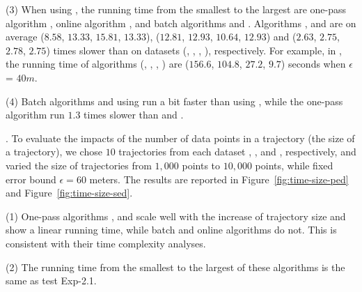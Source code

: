 \sstab (3) When using \sed, the running time from the smallest to the largest are one-pass algorithm \cised, online algorithm \squishe, and batch algorithms \tpa and \dpa. 
Algorithms \tpa, \dpa and \squishe are on average
($8.58$, $13.33$, $15.81$, $13.33$), ($12.81$, $12.93$, $10.64$, $12.93$) and
($2.63$, $2.75$, $2.78$, $2.75$) times slower than \cised on datasets (\ucar, \geolife, \mopsi, \act), respectively.
%
For example, in \mopsi, the running time of algorithms
(\tpa, \dpa, \squishe, \cised) are  ($156.6$, $104.8$, $27.2$, $9.7$) seconds when $\epsilon$ = $40m$.

\sstab (4) Batch algorithms \dpa and \tpa using \sed run a bit faster than using
\ped, while the one-pass algorithm \cised run $1.3$ times slower than \siped and \operb.




.
To evaluate the impacts of the number of data points in a trajectory (\ie the size of a trajectory),
we chose $10$ trajectories from each dataset \ucar, \geolife, \mopsi and \act, respectively,
and varied the size  of trajectories from $1,000$ points to $10,000$ points, while fixed error bound $\epsilon = 60$ meters.
The results are reported in Figure~\ref{fig:time-size-ped} and Figure~\ref{fig:time-size-sed}.

\sstab(1) One-pass algorithms \siped, \operb and \cised scale well with the increase of trajectory size  and show a linear running time, while batch and online algorithms do not.
This is consistent with their time complexity analyses.

\sstab(2) The running time from the smallest to the largest of these algorithms is the same as test {Exp-2.1}.



